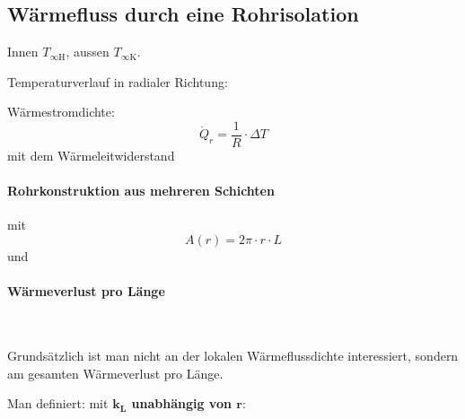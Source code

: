 	\subsection{Wärmefluss durch eine Rohrisolation} %
		Innen $T_\text{$\infty$H}$,
		aussen $T_\text{$\infty$K}$.
		
		Temperaturverlauf in radialer Richtung:
		
		Wärmestromdichte:
		\[
			\dot Q_r = \frac{1}{R} \cdot \Delta T
		\]
		mit dem Wärmeleitwiderstand
		
		\paragraph{Rohrkonstruktion aus mehreren Schichten} %
			mit \[
				A(r) = 2\pi\cdot r \cdot L
			\] und
		
		\paragraph{Wärmeverlust pro Länge} %
			~
			
			Grundsätzlich ist man nicht an der lokalen Wärme\-fluss\-dichte interessiert, sondern am gesamten Wärmeverlust pro Länge.
			
			Man definiert:
			mit \textbf{$\boldsymbol{k_\text{L}}$ unabhängig von $\boldsymbol r$}:
